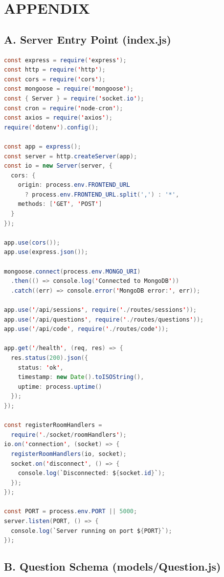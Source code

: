 \chapter*{APPENDIX}

\section*{A. Server Entry Point (index.js)}

\begin{lstlisting}[language=Java, caption={Server Entry Point -- index.js}]
const express = require('express');
const http = require('http');
const cors = require('cors');
const mongoose = require('mongoose');
const { Server } = require('socket.io');
const cron = require('node-cron');
const axios = require('axios');
require('dotenv').config();

const app = express();
const server = http.createServer(app);
const io = new Server(server, {
  cors: {
    origin: process.env.FRONTEND_URL
      ? process.env.FRONTEND_URL.split(',') : '*',
    methods: ['GET', 'POST']
  }
});

app.use(cors());
app.use(express.json());

mongoose.connect(process.env.MONGO_URI)
  .then(() => console.log('Connected to MongoDB'))
  .catch((err) => console.error('MongoDB error:', err));

app.use('/api/sessions', require('./routes/sessions'));
app.use('/api/questions', require('./routes/questions'));
app.use('/api/code', require('./routes/code'));

app.get('/health', (req, res) => {
  res.status(200).json({
    status: 'ok',
    timestamp: new Date().toISOString(),
    uptime: process.uptime()
  });
});

const registerRoomHandlers =
  require('./socket/roomHandlers');
io.on('connection', (socket) => {
  registerRoomHandlers(io, socket);
  socket.on('disconnect', () => {
    console.log(`Disconnected: ${socket.id}`);
  });
});

const PORT = process.env.PORT || 5000;
server.listen(PORT, () => {
  console.log(`Server running on port ${PORT}`);
});
\end{lstlisting}

\section*{B. Question Schema (models/Question.js)}

